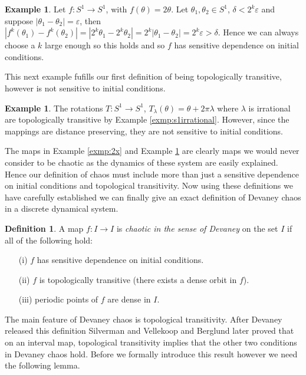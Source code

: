 \documentclass[11pt,a4paper,oneside]{memoir}
\theoremstyle{plain}
\theoremstyle{definition}
\newtheorem{defn}[thm]{Definition}
\newtheorem{exmp}[thm]{Example}
\begin{document}
\begin{exmp} \label{exmp:rotations}
    Let $f: S^1 \to S^1$, with $f(\theta) = 2\theta$. Let $\theta_1, \theta_2 \in S^1$, $\delta < 2^k \varepsilon$ and suppose $|\theta_1 - \theta_2| = \varepsilon$, then $\left\lvert f^k(\theta_1) - f^k(\theta_2)\right\rvert = \left\lvert 2^k\theta_1 - 2^k\theta_2 \right\rvert = 2^k \left\lvert \theta_1 - \theta_2 \right\rvert = 2^k \varepsilon > \delta$. Hence we can always choose a $k$ large enough so this holds and so $f$ has sensitive dependence on initial conditions.
\end{exmp}

This next example fufills our first definition of being topologically transitive, however is not sensitive to initial conditions.
\begin{exmp}
    The rotations $T: S^1 \to S^1$, $T_\lambda(\theta) = \theta + 2\pi \lambda$ where $\lambda$ is irrational are topologically transitive by Example \ref{exmp:s1irrational}. However, since the mappings are distance preserving, they are not sensitive to initial conditions.
\end{exmp}

The maps in Example \ref{exmp:2x} and Example \ref{exmp:rotations} are clearly maps we would never consider to be chaotic as the dynamics of these system are easily explained. Hence our definition of chaos must include more than just a sensitive dependence on initial conditions and topological transitivity. Now using these definitions we have carefully established we can finally give an exact definition of Devaney chaos in a discrete dynamical system.

\begin{defn}
    A map $f: I \to I$ is \emph{chaotic in the sense of Devaney} on the set $I$ if all of the following hold:
    \begin{itemize}
        \item[(i)]$f$ has sensitive dependence on initial conditions.
        \item[(ii)]$f$ is topologically transitive (there exists a dense orbit in $f$).
        \item[(iii)]periodic points of $f$ are dense in $I$.
    \end{itemize}
\end{defn}

The main feature of Devaney chaos is topological transitivity. After Devaney released this definition Silverman \cite{silverman} and Vellekoop and Berglund \cite{vellekoop-berglund} later proved that on an interval map, topological transitivity implies that the other two conditions in Devaney chaos hold. Before we formally introduce this result however we need the following lemma.
\end{document}
